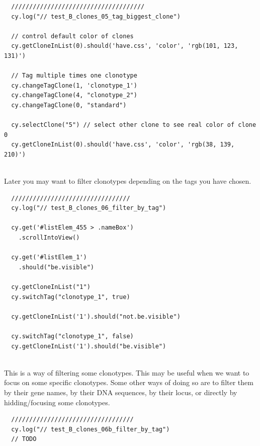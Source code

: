 \begin{verbatim}
  /////////////////////////////////////
  cy.log("// test_B_clones_05_tag_biggest_clone")

  // control default color of clones
  cy.getCloneInList(0).should('have.css', 'color', 'rgb(101, 123, 131)')

  // Tag multiple times one clonotype
  cy.changeTagClone(1, 'clonotype_1')
  cy.changeTagClone(4, "clonotype_2")
  cy.changeTagClone(0, "standard")

  cy.selectClone("5") // select other clone to see real color of clone 0
  cy.getCloneInList(0).should('have.css', 'color', 'rgb(38, 139, 210)')


\end{verbatim}

Later you may want to filter clonotypes depending on the tags you have chosen.


\begin{verbatim}
  /////////////////////////////////
  cy.log("// test_B_clones_06_filter_by_tag")

  cy.get('#listElem_455 > .nameBox')
    .scrollIntoView()

  cy.get('#listElem_1')
    .should("be.visible")

  cy.getCloneInList("1")
  cy.switchTag("clonotype_1", true)

  cy.getCloneInList('1').should("not.be.visible")

  cy.switchTag("clonotype_1", false)
  cy.getCloneInList('1').should("be.visible")


\end{verbatim}

This is a way of filtering some clonotypes. This may be useful when we want to
focus on some specific clonotypes. Some other ways of doing so are to filter them by
their gene names, by their DNA sequences, 
by their locus,
or directly by hidding/focusing some clonotypes.


\begin{verbatim}
  //////////////////////////////////
  cy.log("// test_B_clones_06b_filter_by_tag")
  // TODO

\end{verbatim}


